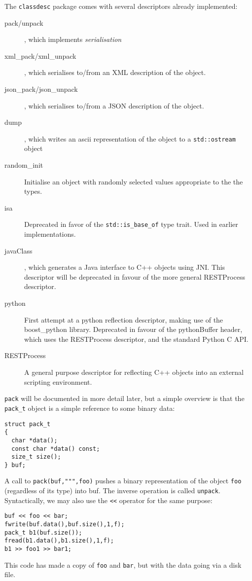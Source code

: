 The {\tt classdesc} package comes with several descriptors already
implemented:
\begin{description}
\item[pack/unpack], which implements {\em
serialisation}
\item[xml\_pack/xml\_unpack], which serialises to/from an
  XML description of the object.
\item[json\_pack/json\_unpack], which serialises to/from a
  JSON description of the object.
\item[dump], which writes an ascii representation of the
  object to a {\tt std::ostream} object
\item[random\_init] Initialise an object with
  randomly selected values appropriate to the the types.
\item[isa] Deprecated in favor of the \verb+std::is_base_of+ type
  trait. Used in earlier \EcoLab{} implementations.
\item[javaClass], which generates a Java interface to
  C++ objects using JNI. This descriptor will be deprecated in favour
  of the more general RESTProcess descriptor.
\item[python] First attempt at a python reflection descriptor, making
  use of the boost\_python library. Deprecated in favour of the
  pythonBuffer header, which uses the RESTProcess descriptor, and the
  standard Python C API.
\item[RESTProcess] A general purpose descriptor for reflecting C++
  objects into an external scripting environment.
\end{description}
{\tt pack} will be documented in
more detail later, but a simple overview is that the {\tt pack\_t}
object is a simple reference to some binary data:
\begin{verbatim}
struct pack_t
{
  char *data();
  const char *data() const;
  size_t size();
} buf;
\end{verbatim}
A call to \verb+pack(buf,""",foo)+ pushes a binary representation of
the object {\tt foo} (regardless of its type) into buf. The inverse
operation is called {\tt unpack}. Syntactically, we may also use the
\verb+<<+ operator for the same purpose:
\begin{verbatim}
buf << foo << bar;
fwrite(buf.data(),buf.size(),1,f);
pack_t b1(buf.size());
fread(b1.data(),b1.size(),1,f);
b1 >> foo1 >> bar1;
\end{verbatim}
This code has made a copy of {\tt foo} and {\tt bar}, but with the
data going via a disk file.

